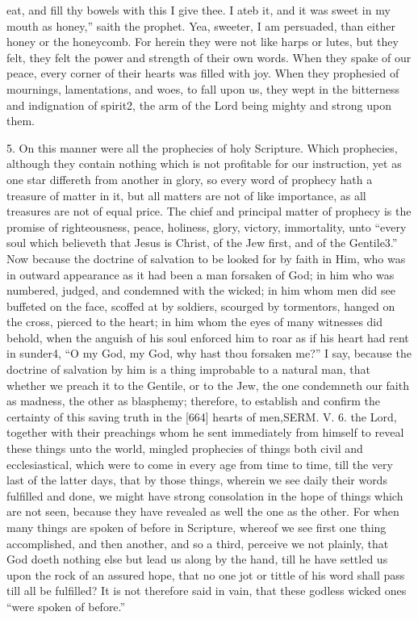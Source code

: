 eat, and fill thy bowels with this I give thee. I ateb it, and it was sweet in my mouth as honey,” saith the prophet. Yea, sweeter, I am persuaded, than either honey or the honeycomb. For herein they were not like harps or lutes, but they felt, they felt the power and strength of their own words. When they spake of our peace, every corner of their hearts was filled with joy. When they prophesied of mournings, lamentations, and woes, to fall upon us, they wept in the bitterness and indignation of spirit2, the arm of the Lord being mighty and strong upon them.

5. On this manner were all the prophecies of holy Scripture. Which prophecies, although they contain nothing which is not profitable for our instruction, yet as one star differeth from another in glory, so every word of prophecy hath a treasure of matter in it, but all matters are not of like importance, as all treasures are not of equal price. The chief and principal matter of prophecy is the promise of righteousness, peace, holiness, glory, victory, immortality, unto “every soul which believeth that Jesus is Christ, of the Jew first, and of the Gentile3.” Now because the doctrine of salvation to be looked for by faith in Him, who was in outward appearance as it had been a man forsaken of God; in him who was numbered, judged, and condemned with the wicked; in him whom men did see buffeted on the face, scoffed at by soldiers, scourged by tormentors, hanged on the cross, pierced to the heart; in him whom the eyes of many witnesses did behold, when the anguish of his soul enforced him to roar as if his heart had rent in sunder4, “O my God, my God, why hast thou forsaken me?” I say, because the doctrine of salvation by him is a thing improbable to a natural man, that whether we preach it to the Gentile, or to the Jew, the one condemneth our faith as madness, the other as blasphemy; therefore, to establish and confirm the certainty of this saving truth in the [664] hearts of men,SERM. V. 6. the Lord, together with their preachings whom he sent immediately from himself to reveal these things unto the world, mingled prophecies of things both civil and ecclesiastical, which were to come in every age from time to time, till the very last of the latter days, that by those things, wherein we see daily their words fulfilled and done, we might have strong consolation in the hope of things which are not seen, because they have revealed as well the one as the other. For when many things are spoken of before in Scripture, whereof we see first one thing accomplished, and then another, and so a third, perceive we not plainly, that God doeth nothing else but lead us along by the hand, till he have settled us upon the rock of an assured hope, that no one jot or tittle of his word shall pass till all be fulfilled? It is not therefore said in vain, that these godless wicked ones “were spoken of before.”

